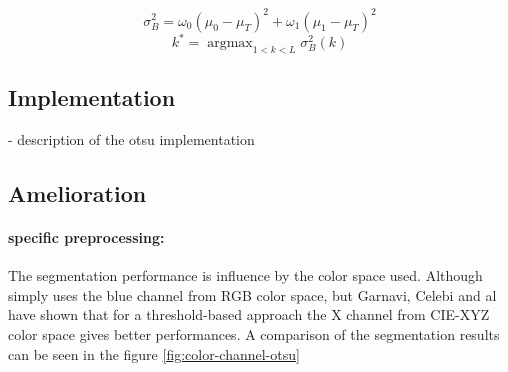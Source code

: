 \documentclass[a4paper,10pt]{article}
\DeclareMathOperator*{\argmax}{argmax}
\begin{document}
\begin{equation} \label{eq:otsuvariance}
  \sigma_B^2 = \omega_0 (\mu_0 - \mu_T)^2 + \omega_1 (\mu_1 - \mu_T)^2 
\end{equation}
\begin{equation} \label{eq:optimthresh}
  k^* = \argmax_{1<k<L} \sigma_B^2(k)   
\end{equation}

\subsection{Implementation}
- description of the otsu implementation

\subsection{Amelioration}
\paragraph{specific preprocessing:}
The segmentation performance is influence by the color space used. Although~\cite{mendonca_comparison_2007} simply uses the blue channel from RGB color space, but 
Garnavi, Celebi and al~\cite{Garnavi2010} have shown that for a 
threshold-based approach the X channel from CIE-XYZ color space gives better performances. A comparison of the segmentation results can be seen in the figure \ref{fig:color-channel-otsu}
\end{document}
